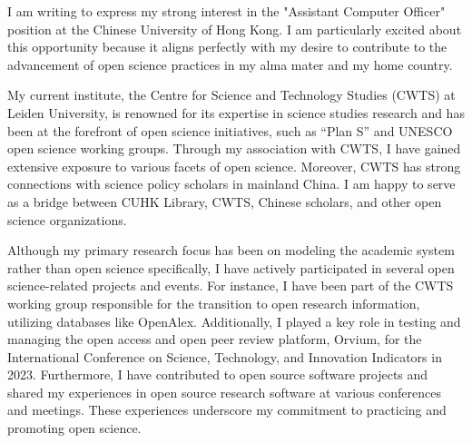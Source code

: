 \documentclass[11pt, a4paper]{awesome-cv}
\begin{document}
\makecvheader[R]

\makecvfooter
  {}%
  {}%
  {}

\makelettertitle

\begin{cvletter}

I am writing to express my strong interest in the "Assistant Computer Officer" position at the Chinese University of Hong Kong. I am particularly excited about this opportunity because it aligns perfectly with my desire to contribute to the advancement of open science practices in my alma mater and my home country.

My current institute, the Centre for Science and Technology Studies (CWTS) at Leiden University, is renowned for its expertise in science studies research and has been at the forefront of open science initiatives, such as ``Plan S'' and UNESCO open science working groups. Through my association with CWTS, I have gained extensive exposure to various facets of open science. Moreover, CWTS has strong connections with science policy scholars in mainland China. I am happy to serve as a bridge between CUHK Library, CWTS, Chinese scholars, and other open science organizations.

Although my primary research focus has been on modeling the academic system rather than open science specifically, I have actively participated in several open science-related projects and events. For instance, I have been part of the CWTS working group responsible for the transition to open research information, utilizing databases like OpenAlex. Additionally, I played a key role in testing and managing the open access and open peer review platform, Orvium, for the International Conference on Science, Technology, and Innovation Indicators in 2023. Furthermore, I have contributed to open source software projects and shared my experiences in open source research software at various conferences and meetings. These experiences underscore my commitment to practicing and promoting open science.


\end{cvletter}
\end{document}
